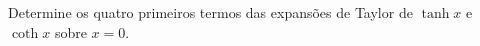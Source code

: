 Determine os quatro primeiros termos das expansões de Taylor de $\tanh x$ e $\coth x$ sobre $x = 0$.

